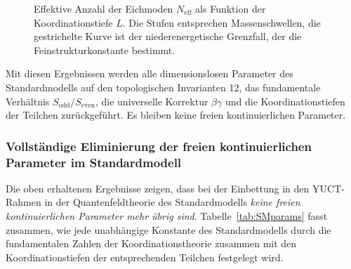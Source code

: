 \documentclass[12pt,a4paper]{article}
\begin{document}
	\begin{figure}[htbp]
		\centering
		\caption{Effektive Anzahl der Eichmoden \(N_{\mathrm{eff}}\) als Funktion der Koordinationstiefe \(L\). Die Stufen entsprechen Massenschwellen, die gestrichelte Kurve ist der niederenergetische Grenzfall, der die Feinstrukturkonstante bestimmt.}
		\label{fig:ladder}
	\end{figure}
	
	Mit diesen Ergebnissen werden alle dimensionslosen Parameter des Standardmodells auf den topologischen Invarianten 12, das fundamentale Verhältnis \(S_{\mathrm{odd}}/S_{\mathrm{even}}\), die universelle Korrektur \(\beta\gamma\) und die Koordinationstiefen der Teilchen zurückgeführt. Es bleiben keine freien kontinuierlichen Parameter.
	
	\subsubsection{Vollständige Eliminierung der freien kontinuierlichen Parameter im Standardmodell}
	
	Die oben erhaltenen Ergebnisse zeigen, dass bei der Einbettung in den YUCT-Rahmen in der Quantenfeldtheorie des Standardmodells \emph{keine freien kontinuierlichen Parameter mehr übrig sind}. Tabelle~\ref{tab:SMparams} fasst zusammen, wie jede unabhängige Konstante des Standardmodells durch die fundamentalen Zahlen der Koordinationstheorie zusammen mit den Koordinationstiefen der entsprechenden Teilchen festgelegt wird.
	
\end{document}
